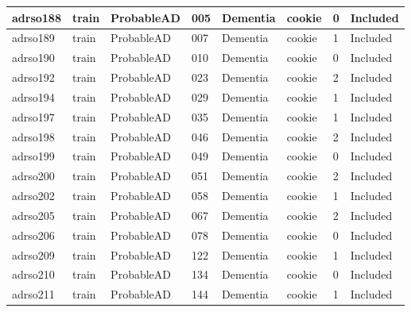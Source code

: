 \begin{center}
\begin{longtable}{|l|l|l|l|l|l|l|l|}
adrso188  & train            & ProbableAD   & 005         & Dementia             & cookie          & 0                & Included      \\ \hline
adrso189  & train            & ProbableAD   & 007         & Dementia             & cookie          & 1                & Included      \\ \hline
adrso190  & train            & ProbableAD   & 010         & Dementia             & cookie          & 0                & Included      \\ \hline
adrso192  & train            & ProbableAD   & 023         & Dementia             & cookie          & 2                & Included      \\ \hline
adrso194  & train            & ProbableAD   & 029         & Dementia             & cookie          & 1                & Included      \\ \hline
adrso197  & train            & ProbableAD   & 035         & Dementia             & cookie          & 1                & Included      \\ \hline
adrso198  & train            & ProbableAD   & 046         & Dementia             & cookie          & 2                & Included      \\ \hline
adrso199  & train            & ProbableAD   & 049         & Dementia             & cookie          & 0                & Included      \\ \hline
adrso200  & train            & ProbableAD   & 051         & Dementia             & cookie          & 2                & Included      \\ \hline
adrso202  & train            & ProbableAD   & 058         & Dementia             & cookie          & 1                & Included      \\ \hline
adrso205  & train            & ProbableAD   & 067         & Dementia             & cookie          & 2                & Included      \\ \hline
adrso206  & train            & ProbableAD   & 078         & Dementia             & cookie          & 0                & Included      \\ \hline
adrso209  & train            & ProbableAD   & 122         & Dementia             & cookie          & 1                & Included      \\ \hline
adrso210  & train            & ProbableAD   & 134         & Dementia             & cookie          & 0                & Included      \\ \hline
adrso211  & train            & ProbableAD   & 144         & Dementia             & cookie          & 1                & Included      \\ \hline

\end{longtable}
\end{center}
